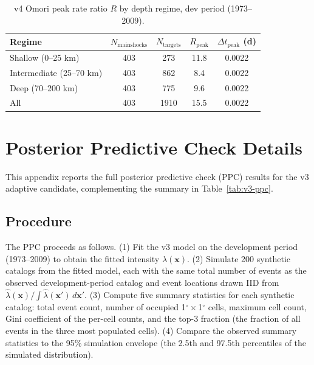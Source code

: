 \documentclass[10pt,a4paper,twocolumn]{article}
\begin{document}
\begin{table}[t]
\centering
\caption{v4 Omori peak rate ratio $R$ by depth regime, dev period (1973--2009).}\label{tab:v4-omori-depth}
\small
\begin{tabular*}{\columnwidth}{@{\extracolsep{\fill}}lcccc}
\toprule
Regime & $N_{\text{mainshocks}}$ & $N_{\text{targets}}$ & $R_{\text{peak}}$ & $\Delta t_{\text{peak}}$ (d) \\
\midrule
Shallow (0--25 km)       & 403 & 273 & 11.8 & 0.0022 \\
Intermediate (25--70 km) & 403 & 862 & 8.4  & 0.0022 \\
Deep (70--200 km)        & 403 & 775 & 9.6  & 0.0022 \\
All                      & 403 & 1910 & 15.5 & 0.0022 \\
\bottomrule
\end{tabular*}
\end{table}

\section{Posterior Predictive Check Details}\label{app:ppc}

This appendix reports the full posterior predictive check (PPC) results for the v3 adaptive candidate, complementing the summary in Table~\ref{tab:v3-ppc}.

\subsection{Procedure}

The PPC proceeds as follows. (1) Fit the v3 model on the development period (1973--2009) to obtain the fitted intensity $\hat\lambda(\mathbf{x})$. (2) Simulate 200 synthetic catalogs from the fitted model, each with the same total number of events as the observed development-period catalog and event locations drawn IID from $\hat\lambda(\mathbf{x}) / \int \hat\lambda(\mathbf{x}')\, d\mathbf{x}'$. (3) Compute five summary statistics for each synthetic catalog: total event count, number of occupied 1$^\circ\times$1$^\circ$ cells, maximum cell count, Gini coefficient of the per-cell counts, and the top-3 fraction (the fraction of all events in the three most populated cells). (4) Compare the observed summary statistics to the 95\% simulation envelope (the 2.5th and 97.5th percentiles of the simulated distribution).
\end{document}
